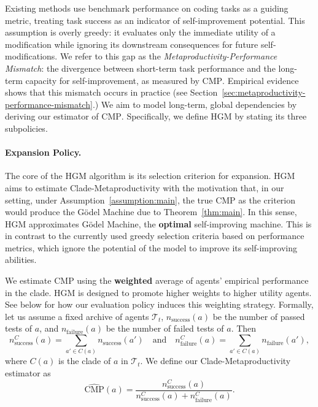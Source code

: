 \documentclass{article}
\begin{document}
 Existing methods use benchmark performance on coding tasks as a guiding metric, treating task success as an indicator of self-improvement potential. This assumption is overly greedy: it evaluates only the immediate utility of a modification while ignoring its downstream consequences for future self-modifications. We refer to this gap as the \emph{Metaproductivity-Performance Mismatch}: the divergence between short-term task performance and the long-term capacity for self-improvement, as measured by $\mathrm{CMP}$. Empirical evidence shows that this mismatch occurs in practice (see Section~\ref{sec:metaproductivity-performance-mismatch}.) 
We aim to model long-term, global dependencies by deriving our estimator of $\mathrm{CMP}$. Specifically, we define HGM by stating its three subpolicies. 



\paragraph{Expansion Policy.}\label{method:expand-policy}

 The core of the HGM algorithm is its selection criterion for expansion. HGM aims to estimate Clade-Metaproductivity with the motivation that, in our setting, under Assumption~\ref{assumption:main}, the true $\mathrm{CMP}$ as the criterion would produce the G\"odel Machine due to Theorem~\ref{thm:main}. In this sense, HGM approximates G\"odel Machine, the \textbf{optimal} self-improving machine. This is in contrast to the currently used greedy selection criteria based on performance metrics, which ignore the potential of the model to improve its self-improving abilities.

We estimate $\mathrm{CMP}$ using the \textbf{weighted} average of agents' empirical performance in the clade. 
HGM is designed to promote higher weights to higher utility agents. See below for how our evaluation policy induces this weighting strategy.
Formally, let us assume a fixed archive of agents $\mathcal{T}_t$, $n_{\text{success}}(a)$ be the number of passed tests of $a$, and $n_{\text{failure}}(a)$ be the number of failed tests of $a$. Then
\[
n^C_\text{success}(a) = \sum_{a' \in C(a)} n_\text{success}(a') \quad \text{and} \quad n^C_\text{failure}(a) = \sum_{a' \in C(a)} n_\text{failure}(a'),
\]
where $C(a)$ is the clade of $a$ in $\mathcal{T}_t$. We define our Clade-Metaproductivity estimator as
\[{\widehat{\mathrm{CMP}}(a)} =\frac{n^C_\text{success}(a)}{n^C_\text{success}(a)+n^C_\text{failure}(a)}.\]
\end{document}
